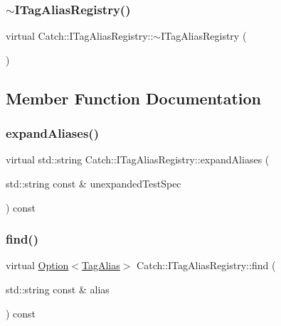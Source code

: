 \subsubsection{\texorpdfstring{$\sim$\+I\+Tag\+Alias\+Registry()}{~ITagAliasRegistry()}}
{\footnotesize\ttfamily virtual Catch\+::\+I\+Tag\+Alias\+Registry\+::$\sim$\+I\+Tag\+Alias\+Registry (\begin{DoxyParamCaption}{ }\end{DoxyParamCaption})\hspace{0.3cm}{\ttfamily [virtual]}}



\subsection{Member Function Documentation}
\mbox{\label{struct_catch_1_1_i_tag_alias_registry_ae729a7532faf7466db1a157ce0395170}} 
\subsubsection{\texorpdfstring{expand\+Aliases()}{expandAliases()}}
{\footnotesize\ttfamily virtual std\+::string Catch\+::\+I\+Tag\+Alias\+Registry\+::expand\+Aliases (\begin{DoxyParamCaption}\item[{std\+::string const \&}]{unexpanded\+Test\+Spec }\end{DoxyParamCaption}) const\hspace{0.3cm}{\ttfamily [pure virtual]}}

\mbox{\label{struct_catch_1_1_i_tag_alias_registry_a7d2fba4d39cfcc62c2695fcde4f989c3}} 
\subsubsection{\texorpdfstring{find()}{find()}}
{\footnotesize\ttfamily virtual \mbox{\hyperlink{class_catch_1_1_option}{Option}}$<$\mbox{\hyperlink{struct_catch_1_1_tag_alias}{Tag\+Alias}}$>$ Catch\+::\+I\+Tag\+Alias\+Registry\+::find (\begin{DoxyParamCaption}\item[{std\+::string const \&}]{alias }\end{DoxyParamCaption}) const\hspace{0.3cm}{\ttfamily [pure virtual]}}

